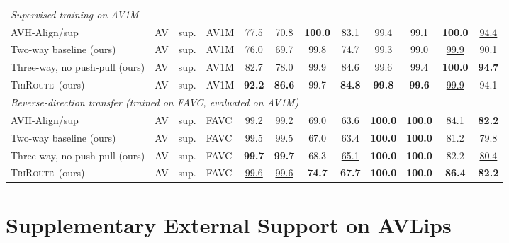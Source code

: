 \documentclass{article}
\newcommand{\method}{\textsc{TriRoute}}
\begin{document}
\begin{table}[h]
{\begin{tabular}{llllcccccccc}
        \midrule
        \multicolumn{12}{l}{\emph{Supervised training on AV1M}} \\
        AVH-Align/sup \citep{smeu2025avhalign} & AV & sup. & AV1M & 77.5 & 70.8 & \textbf{100.0} & 83.1 & 99.4 & 99.1 & \textbf{100.0} & \underline{94.4} \\
        Two-way baseline (ours)          & AV & sup. & AV1M & 76.0 & 69.7 & 99.8 & 74.7 & 99.3 & 99.0 & \underline{99.9} & 90.1 \\
        Three-way, no push-pull (ours)   & AV & sup. & AV1M & \underline{82.7} & \underline{78.0} & \underline{99.9} & \underline{84.6} & \underline{99.6} & \underline{99.4} & \textbf{100.0} & \textbf{94.7} \\
        \method\ (ours)                  & AV & sup. & AV1M & \textbf{92.2} & \textbf{86.6} & 99.7 & \textbf{84.8} & \textbf{99.8} & \textbf{99.6} & \underline{99.9} & 94.1 \\
        \midrule
        \multicolumn{12}{l}{\emph{Reverse-direction transfer (trained on FAVC, evaluated on AV1M)}} \\
        AVH-Align/sup \citep{smeu2025avhalign} & AV & sup. & FAVC & 99.2 & 99.2 & \underline{69.0} & 63.6 & \textbf{100.0} & \textbf{100.0} & \underline{84.1} & \textbf{82.2} \\
        Two-way baseline (ours)          & AV & sup. & FAVC & 99.5 & 99.5 & 67.0 & 63.4 & \textbf{100.0} & \textbf{100.0} & 81.2 & 79.8 \\
        Three-way, no push-pull (ours)   & AV & sup. & FAVC & \textbf{99.7} & \textbf{99.7} & 68.3 & \underline{65.1} & \textbf{100.0} & \textbf{100.0} & 82.2 & \underline{80.4} \\
        \method\ (ours)                  & AV & sup. & FAVC & \underline{99.6} & \underline{99.6} & \textbf{74.7} & \textbf{67.7} & \textbf{100.0} & \textbf{100.0} & \textbf{86.4} & \textbf{82.2} \\
        \bottomrule
    \end{tabular}}
\end{table}

\section{Supplementary External Support on AVLips}
\label{app:avlips}
\end{document}
